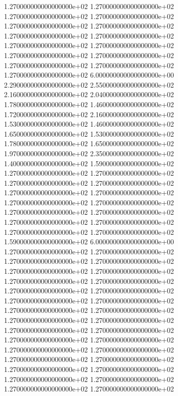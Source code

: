 1.270000000000000000e+02 1.270000000000000000e+02 1.270000000000000000e+02 1.270000000000000000e+02 1.270000000000000000e+02 1.270000000000000000e+02 1.270000000000000000e+02 1.270000000000000000e+02 1.270000000000000000e+02 1.270000000000000000e+02 1.270000000000000000e+02 1.270000000000000000e+02 1.270000000000000000e+02 1.270000000000000000e+02 1.270000000000000000e+02 6.000000000000000000e+00 2.290000000000000000e+02 2.550000000000000000e+02 2.160000000000000000e+02 2.040000000000000000e+02 1.780000000000000000e+02 1.460000000000000000e+02 1.720000000000000000e+02 2.160000000000000000e+02 1.530000000000000000e+02 1.460000000000000000e+02 1.650000000000000000e+02 1.530000000000000000e+02 1.780000000000000000e+02 1.650000000000000000e+02 1.970000000000000000e+02 2.350000000000000000e+02 1.400000000000000000e+02 1.590000000000000000e+02 1.270000000000000000e+02 1.270000000000000000e+02 1.270000000000000000e+02 1.270000000000000000e+02 1.270000000000000000e+02 1.270000000000000000e+02 1.270000000000000000e+02 1.270000000000000000e+02 1.270000000000000000e+02 1.270000000000000000e+02 1.270000000000000000e+02 1.270000000000000000e+02 1.270000000000000000e+02 1.270000000000000000e+02 1.590000000000000000e+02 6.000000000000000000e+00 1.270000000000000000e+02 1.270000000000000000e+02 1.270000000000000000e+02 1.270000000000000000e+02 1.270000000000000000e+02 1.270000000000000000e+02 1.270000000000000000e+02 1.270000000000000000e+02 1.270000000000000000e+02 1.270000000000000000e+02 1.270000000000000000e+02 1.270000000000000000e+02 1.270000000000000000e+02 1.270000000000000000e+02 1.270000000000000000e+02 1.270000000000000000e+02 1.270000000000000000e+02 1.270000000000000000e+02 1.270000000000000000e+02 1.270000000000000000e+02 1.270000000000000000e+02 1.270000000000000000e+02 1.270000000000000000e+02 1.270000000000000000e+02 1.270000000000000000e+02 1.270000000000000000e+02 1.270000000000000000e+02 1.270000000000000000e+02 1.270000000000000000e+02 1.270000000000000000e+02
